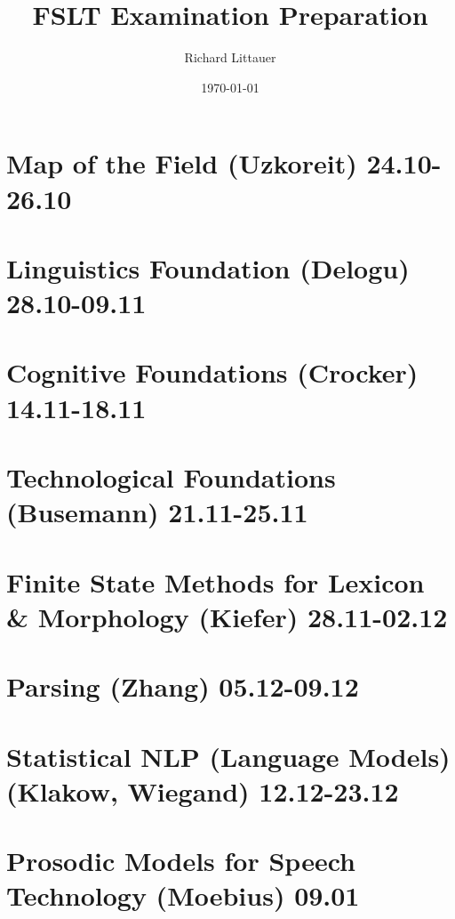 \documentclass[11pt]{article}
\title{FSLT Examination Preparation}
\author{Richard Littauer}		%
\date{\today}                          		%
\begin{document}
\maketitle


\section{Map of the Field (Uzkoreit) 24.10-26.10}

\section{Linguistics Foundation (Delogu) 28.10-09.11}

\section{ Cognitive Foundations (Crocker) 14.11-18.11}

\section{Technological Foundations (Busemann) 21.11-25.11}

\section{Finite State Methods for Lexicon \& Morphology (Kiefer) 28.11-02.12}

\section{Parsing (Zhang) 05.12-09.12}

\section{Statistical NLP (Language Models) (Klakow, Wiegand) 12.12-23.12}

\section{Prosodic Models for Speech Technology (Moebius) 09.01}
\end{document}
